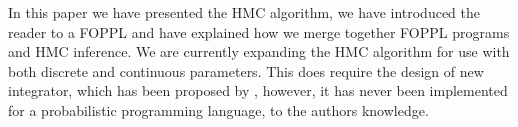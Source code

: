 \documentclass[twoside]{article}
\begin{document}
In this paper we have presented the HMC algorithm, we have introduced the reader to a FOPPL and have explained how we merge together FOPPL programs and HMC inference. We are currently expanding the HMC algorithm for use with both discrete and continuous parameters. This does require the design of new integrator, which has been proposed by \citep{nishimura2017discontinuous}, however, it has never been implemented for a probabilistic programming language, to the authors knowledge.  

%
%
%
%
%
%
\end{document}
